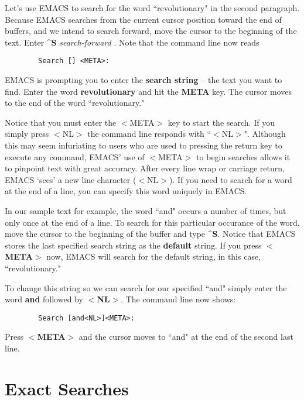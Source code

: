 Let's use EMACS to search for the word ``revolutionary" in the second
paragraph.  Because EMACS searches from the current cursor position
toward the end of buffers, and we intend to search forward, move the
cursor to the beginning of the text.  Enter {\bf{}\^{}S}
{\it{}search-forward} .  Note that the command
line now reads

\begin{verbatim}
        Search [] <META>:
\end{verbatim}

EMACS is prompting you to enter the {\bf{}search string} -- the text you
want to find.  Enter the word {\bf{}revolutionary} and hit the {\bf{}META}
key.  The cursor moves to the end of the word ``revolutionary."

Notice that you must enter the $<${}META$>${} key to start the search.
If you  simply press $<${}NL$>${} the command line
responds with ``$<${}NL$>${}".  Although this may seem infuriating to
users who are used to pressing the return key to execute any command,
EMACS' use of $<${}META$>${} to begin searches allows it to pinpoint
text with great accuracy.  After every line wrap or carriage return,
EMACS `sees' a new line character ($<${}NL$>${}).  If you need to
search for a word at the end of a line, you can specify this word
uniquely in EMACS.

In our sample text for example, the word ``and" occurs a number of
times, but only once at the end of a line.  To search for this
particular occurance of the word, move the cursor to the beginning of
the buffer and type {\bf{}\^{}S}.  Notice that EMACS stores the last
specified  search string as the {\bf{}default}
string.  If you press {\bf{}$<${}META$>${}} now, EMACS will search for
the default string, in this case, ``revolutionary."

To change this string so we can search for our specified ``and" simply
enter the word {\bf{}and} followed by {\bf{}$<${}NL$>${}}.  The command
line now shows:

\begin{verbatim}
        Search [and<NL>]<META>:
\end{verbatim}

Press {\bf{}$<${}META$>${}} and the cursor moves to ``and" at the end
of the second last line.

\section{Exact Searches}

